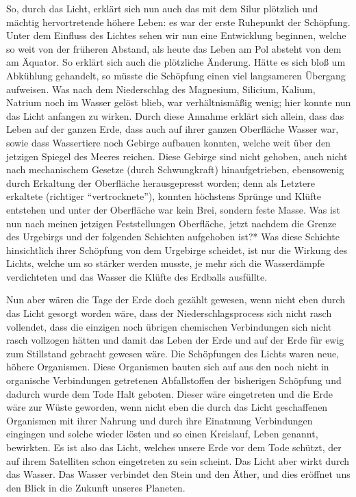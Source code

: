 \documentclass[a4paper, 12pt, oneside]{article}
\begin{document}
So, durch das Licht, erklärt sich nun auch das mit dem Silur plötzlich und mächtig hervortretende höhere Leben: es war der erste Ruhepunkt der Schöpfung. Unter dem Einfluss des Lichtes sehen wir nun eine Entwicklung beginnen, welche so weit von der früheren Abstand, als heute das Leben am Pol absteht von dem am Äquator. So erklärt sich auch die plötzliche Änderung. Hätte es sich bloß um Abkühlung gehandelt, so müsste die Schöpfung einen viel langsameren Übergang aufweisen. Was nach dem Niederschlag des Magnesium, Silicium, Kalium, Natrium noch im Wasser gelöst blieb, war verhältnismäßig wenig; hier konnte nun das Licht anfangen zu wirken. Durch diese Annahme erklärt sich allein, dass das Leben auf der ganzen Erde, dass auch auf ihrer ganzen Oberfläche Wasser war, sowie dass Wassertiere noch Gebirge aufbauen konnten, welche weit über den jetzigen Spiegel des Meeres reichen. Diese Gebirge sind nicht gehoben, auch nicht nach mechanischem Gesetze (durch Schwungkraft) hinaufgetrieben, ebensowenig durch Erkaltung der Oberfläche herausgepresst worden; denn als Letztere erkaltete (richtiger "`vertrocknete"'), konnten höchstens Sprünge und Klüfte entstehen und unter der Oberfläche war kein Brei, sondern feste Masse. Was ist nun nach meinen jetzigen Feststellungen Oberfläche, jetzt nachdem die Grenze des Urgebirgs und der folgenden Schichten aufgehoben ist?* Was diese Schichte hinsichtlich ihrer Schöpfung von dem Urgebirge scheidet, ist nur die Wirkung des Lichts, welche um so stärker werden musste, je mehr sich die Wasserdämpfe verdichteten und das Wasser die Klüfte des Erdballs ausfüllte.

Nun aber wären die Tage der Erde doch gezählt gewesen, wenn nicht eben durch das Licht gesorgt worden wäre, dass der Niederschlagsprocess sich nicht rasch vollendet, dass die einzigen noch übrigen chemischen Verbindungen sich nicht rasch vollzogen hätten und damit das Leben der Erde und auf der Erde für ewig zum Stillstand gebracht gewesen wäre. Die Schöpfungen des Lichts waren neue, höhere Organismen. Diese Organismen bauten sich auf aus den noch nicht in organische Verbindungen getretenen Abfallstoffen der bisherigen Schöpfung und dadurch wurde dem Tode Halt geboten. Dieser wäre eingetreten und die Erde wäre zur Wüste geworden, wenn nicht eben die durch das Licht geschaffenen Organismen mit ihrer Nahrung und durch ihre Einatmung Verbindungen eingingen und solche wieder lösten und so einen Kreislauf, Leben genannt, bewirkten. Es ist also das Licht, welches unsere Erde vor dem Tode schützt, der auf ihrem Satelliten schon eingetreten zu sein scheint. Das Licht aber wirkt durch das Wasser. Das Wasser verbindet den Stein und den Äther, und dies eröffnet uns den Blick in die Zukunft unseres Planeten.
\end{document}
